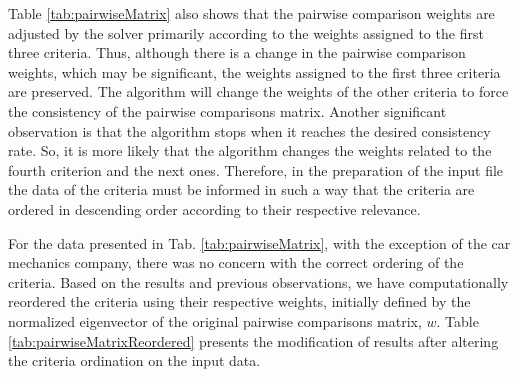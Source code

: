 \documentclass[10pt,fleqn,a4paper,twoside]{article}
\begin{document}
Table \ref{tab:pairwiseMatrix} also shows that the pairwise comparison weights are adjusted by the solver primarily according to the weights assigned to the first three criteria. Thus, although there is a change in the pairwise comparison weights, which may be significant, the weights assigned to the first three criteria are preserved. The algorithm will change the weights of the other criteria to force the consistency of the pairwise comparisons matrix. Another significant observation is that the algorithm stops when it reaches the desired consistency rate. So, it is more likely that the algorithm changes the weights related to the fourth criterion and the next ones. Therefore, in the preparation of the input file the data of the criteria must be informed in such a way that the criteria are ordered in descending order according to their respective relevance.

For the data presented in Tab. \ref{tab:pairwiseMatrix}, with the exception of the car mechanics company, there was no concern with the correct ordering of the criteria. Based on the results and previous observations, we have computationally reordered the criteria using their respective weights, initially defined by the normalized eigenvector of the original pairwise comparisons matrix, $w$. Table \ref{tab:pairwiseMatrixReordered} presents the modification of results after altering the criteria ordination on the input data.
\end{document}

